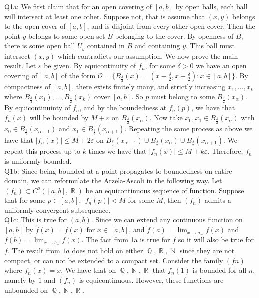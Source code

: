 \documentclass[letterpaper]{article}
\DeclareMathOperator{\R}{\mathbb{R}}
\DeclareMathOperator{\N}{\mathbb{N}}
\DeclareMathOperator{\Q}{\mathbb{Q}}
\begin{document}
\noindent Q1a: We first claim that for an open covering of $[a,b]$ by open balls, each ball will intersect at least one other. Suppose not, that is assume that $(x,y)$ belongs to the open cover of $[a,b]$, and is disjoint from every other open cover. Then the point $y$ belongs to some open set $B$ belonging to the cover. By openness of  $B$, there is some open ball $U_y$ contained in $B$ and containing $y$. This ball must intersect $(x,y)$ which contradicts our assumption. We now prove the main result. Let $\varepsilon $ be given. By equicontinuity of $f_n$, for some $\delta>0$ we have an open covering of $[a,b]$ of the form $\mathcal{O} = \{B_{\frac{\delta}{2}}(x) =(x-\frac{\delta}{2},x+\frac{\delta}{2}): x\in [a,b]\}$. By compactness of $[a,b]$, there exists finitely many, and strictly increasing $x_1, \dots , x_k$ where $B_{\frac{\delta}{2}}(x_1), \dots , B_{\frac{\delta}{2}}(x_k)$ cover $[a,b]$. So $p$ must belong to some $B_{\frac{\delta}{2}}(x_\alpha)$. By equicontinuinty of $f_n$, and by the boundedness at $f_n(p)$, we have that $f_n(x)$ will be bounded by $M+\varepsilon$ on $B_{\frac{\delta}{2}}(x_\alpha)$. Now take $x_0,x_1\in B_{\frac{\delta}{2}}(x_\alpha)$ with $x_0\in B_{\frac{\delta}{2}}(x_{\alpha-1})$ and $x_1\in B_{\frac{\delta}{2}}(x_{\alpha+1})$. Repeating the same process as above we have that $|f_n(x)| \leq M+2\varepsilon$ on $B_{\frac{\delta}{2}}(x_{\alpha-1})\cup B_{\frac{\delta}{2}}(x_\alpha)\cup B_{\frac{\delta}{2}}(x_{\alpha+1})$. We repeat this process up to $k$ times we have that $|f_n(x)|\leq M+k\varepsilon$. Therefore, $f_n$ is uniformly bounded. 
\newline \\ Q1b: Since being bounded at a point propagates to boundedness on entire domain, we can reformulate the Arzela-Ascoli in the following way. Let $(f_n)\subset C^o([a,b],\R)$ be an equicontinuous sequence of function. Suppose that for some $p\in [a,b]$, $|f_n(p)|<M$ for some $M$, then $(f_n)$ admits a uniformly convergent subsequence. 
\newline \\ Q1c: This is true for $(a,b)$. Since we can extend any continuous function on $[a,b]$ by $\tilde{f}(x) = f(x)$ for $x\in [a,b]$, and $\tilde{f}(a) = \lim_{x\rightarrow a_{-}}f(x)$ and $\tilde{f}(b) = \lim_{x\to b_{+}} f(x)$. The fact from 1a is true for $\tilde{f}$ so it will also be true for $f$. The result from $1a$ does not hold on either $\Q,\R,\N$ since they are not compact, or can not be extended to a compact set. Consider the family $(fn)$ where $f_n(x) = x$. We have that on $\Q,\N,\R$ that $f_n(1)$ is bounded for all $n$, namely by $1$ and $(f_n)$ is equicontinuous.  However, these functions are unbounded on $\Q,\N,\R$. 
\end{document}
